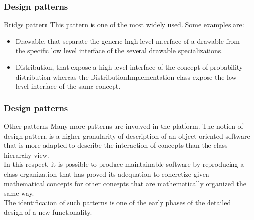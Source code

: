 \documentclass[8pt]{beamer}
\begin{document}
\begin{frame}
  \frametitle{Design patterns}

  \begin{block}{Bridge pattern}
    This pattern is one of the most widely used. Some examples are:
    \begin{itemize}
    \item \alert{Drawable}, that separate the generic high level interface of a drawable from the specific low level interface of the several drawable specializations.
    \item \alert{Distribution}, that expose a high level interface of the concept of probability distribution whereas the DistributionImplementation class expose the low level interface of the same concept.
    \end{itemize}
  \end{block}
  \centering {}
\end{frame}
\begin{frame}
  \frametitle{Design patterns}
  \begin{block}{Other patterns}
    Many more patterns are involved in the platform. The notion of design pattern is a higher granularity of description of an object oriented software that is more adapted to describe the interaction of concepts than the class hierarchy view.\\
    In this respect, it is possible to produce maintainable software by reproducing a class organization that has proved its adequation to concretize given mathematical concepts for other concepts that are mathematically organized the same way.\\
    The identification of such patterns is one of the early phases of the detailed design of a new functionality.
  \end{block}
\end{frame}
\end{document}
